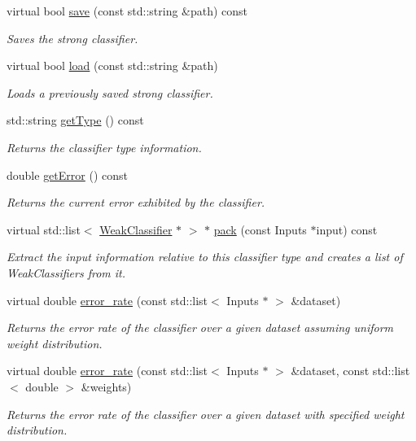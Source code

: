 \begin{DoxyCompactItemize}
virtual bool \hyperlink{classiCub_1_1boostMIL_1_1StrongClassifier_ac812325b217d16e1e3c469e5d4a9eb76}{save} (const std\+::string \&path) const 
\begin{DoxyCompactList}\small\item\em Saves the strong classifier. \end{DoxyCompactList}\item 
virtual bool \hyperlink{classiCub_1_1boostMIL_1_1StrongClassifier_a3678df5fef278e2a2e6ceabb4c82f81b}{load} (const std\+::string \&path)
\begin{DoxyCompactList}\small\item\em Loads a previously saved strong classifier. \end{DoxyCompactList}\item 
std\+::string \hyperlink{classiCub_1_1boostMIL_1_1WeakClassifier_aa5de990b0baac11f35f74493ca853ac5}{get\+Type} () const 
\begin{DoxyCompactList}\small\item\em Returns the classifier type information. \end{DoxyCompactList}\item 
double \hyperlink{classiCub_1_1boostMIL_1_1WeakClassifier_a525811a7380bcfd3cbc1edbe90e0842a}{get\+Error} () const 
\begin{DoxyCompactList}\small\item\em Returns the current error exhibited by the classifier. \end{DoxyCompactList}\item 
virtual std\+::list$<$ \hyperlink{classiCub_1_1boostMIL_1_1WeakClassifier}{Weak\+Classifier} $\ast$ $>$ $\ast$ \hyperlink{classiCub_1_1boostMIL_1_1WeakClassifier_abdf0b9bd48be536cd44939dc733097ed}{pack} (const Inputs $\ast$input) const 
\begin{DoxyCompactList}\small\item\em Extract the input information relative to this classifier type and creates a list of Weak\+Classifiers from it. \end{DoxyCompactList}\item 
virtual double \hyperlink{classiCub_1_1boostMIL_1_1WeakClassifier_a8f9de230214c99305df65010e5ddbe77}{error\+\_\+rate} (const std\+::list$<$ Inputs $\ast$ $>$ \&dataset)
\begin{DoxyCompactList}\small\item\em Returns the error rate of the classifier over a given dataset assuming uniform weight distribution. \end{DoxyCompactList}\item 
virtual double \hyperlink{classiCub_1_1boostMIL_1_1WeakClassifier_a294f03d21af03a5f96875562a5a979a0}{error\+\_\+rate} (const std\+::list$<$ Inputs $\ast$ $>$ \&dataset, const std\+::list$<$ double $>$ \&weights)
\begin{DoxyCompactList}\small\item\em Returns the error rate of the classifier over a given dataset with specified weight distribution. \end{DoxyCompactList}\end{DoxyCompactItemize}
